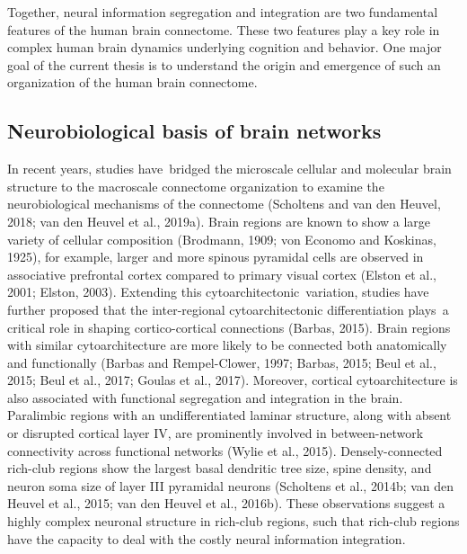 \begin{refsection}
Together, neural information segregation and integration are two fundamental features of the human brain connectome. These two features play a key role in complex human brain dynamics underlying cognition and behavior. One major goal of the current thesis is to understand the origin and emergence of such an organization of the human brain connectome.

\subsection*{Neurobiological basis of brain networks}
In recent years, studies have bridged the microscale cellular and molecular brain structure to the macroscale connectome organization to examine the neurobiological mechanisms of the connectome (Scholtens and van den Heuvel, 2018; van den Heuvel et al., 2019a). Brain regions are known to show a large variety of cellular composition (Brodmann, 1909; von Economo and Koskinas, 1925), for example, larger and more spinous pyramidal cells are observed in associative prefrontal cortex compared to primary visual cortex (Elston et al., 2001; Elston, 2003). Extending this cytoarchitectonic variation, studies have further proposed that the inter-regional cytoarchitectonic differentiation plays a critical role in shaping cortico-cortical connections (Barbas, 2015). Brain regions with similar cytoarchitecture are more likely to be connected both anatomically and functionally (Barbas and Rempel-Clower, 1997; Barbas, 2015; Beul et al., 2015; Beul et al., 2017; Goulas et al., 2017). Moreover, cortical cytoarchitecture is also associated with functional segregation and integration in the brain. Paralimbic regions with an undifferentiated laminar structure, along with absent or disrupted cortical layer IV, are prominently involved in between-network connectivity across functional networks (Wylie et al., 2015). Densely-connected rich-club regions show the largest basal dendritic tree size, spine density, and neuron soma size of layer III pyramidal neurons (Scholtens et al., 2014b; van den Heuvel et al., 2015; van den Heuvel et al., 2016b). These observations suggest a highly complex neuronal structure in rich-club regions, such that rich-club regions have the capacity to deal with the costly neural information integration. 


\end{refsection}
